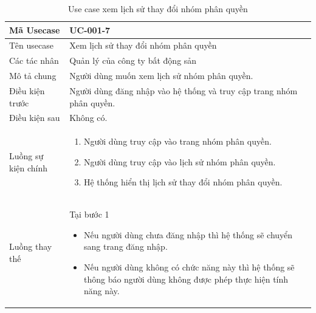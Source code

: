 \documentclass[12pt,a4paper]{article}
\begin{document}
    \begin{table}[H]
        \centering
        \begin{tabular}{|p{3.5cm}|p{11.5cm}|c|}
            \hline
            Mã Usecase      & UC-001-7                                                             \\
            \hline
            Tên usecase     & Xem lịch sử thay đổi nhóm phân quyền                                 \\
            \hline
            Các tác nhân    & Quản lý của công ty bất động sản                                     \\
            \hline
            Mô tả chung     & Người dùng muốn xem lịch sử nhóm phân quyền.                         \\
            \hline
            Điều kiện trước & Người dùng đăng nhập vào hệ thống và truy cập trang nhóm phân quyền. \\
            \hline
            Điều kiện sau   & Không có.                                                            \\
            \hline
            Luồng sự kiện chính & \vspace{-.8cm}\begin{enumerate}
                                                    \item Người dùng truy cập vào trang nhóm phân quyền.
                                                    \item Người dùng truy cập vào lịch sử nhóm phân quyền.
                                                    \item Hệ thống hiển thị lịch sử thay đổi nhóm phân quyền.
            \end{enumerate}
            \\
            \hline
            Luồng thay thế & Tại bước 1\newline
            \vspace{-.8cm}\begin{itemize}
                              \item Nếu người dùng chưa đăng nhập thì hệ thống sẽ chuyển sang trang đăng nhập.
                              \item Nếu người dùng không có chức năng này thì hệ thống sẽ thông báo người dùng không được phép thực hiện tính năng này.
            \end{itemize}
            \\ \hline
        \end{tabular}
        \caption{Use case xem lịch sử thay đổi nhóm phân quyền }
    \end{table}
\end{document}
